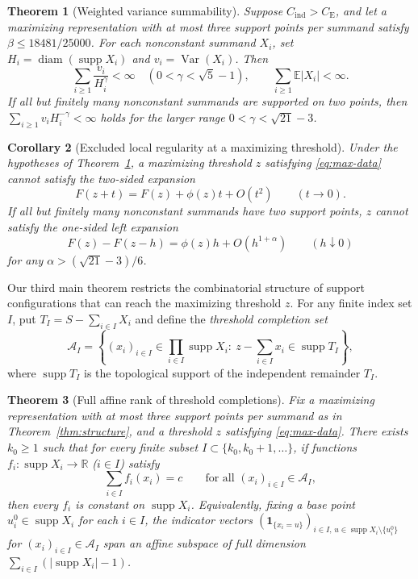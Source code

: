 \documentclass[11pt]{article}
\numberwithin{equation}{section}
\newtheorem{theorem}{Theorem}[section]
\newtheorem{corollary}[theorem]{Corollary}
\theoremstyle{definition}
\DeclareMathOperator{\Var}{Var}
\DeclareMathOperator{\diam}{diam}
\DeclareMathOperator{\supp}{supp}
\newcommand{\E}{\mathbb E}
\newcommand{\R}{\mathbb R}
\newcommand{\ind}{\mathbf1}
\newcommand{\ce}{C_{\mathrm E}}
\newcommand{\ci}{C_{\mathrm{ind}}}
\begin{document}
\begin{theorem}[Weighted variance summability]\label{thm:weighted-variance}
Suppose $\ci>\ce$, and let a maximizing representation with at most three
support points per summand satisfy $\beta\le18481/25000$. For each
nonconstant summand $X_i$, set $H_i=\diam(\supp X_i)$ and $v_i=\Var(X_i)$.
Then
\[
 \sum_{i\ge1}\frac{v_i}{H_i^\gamma}<\infty
       \quad(0<\gamma<\sqrt5-1),\qquad
                         \sum_{i\ge1}\E|X_i|<\infty.
\]
If all but finitely many nonconstant summands are supported on two points,
then $\sum_{i\ge1}v_iH_i^{-\gamma}<\infty$ holds for the larger range
$0<\gamma<\sqrt{21}-3$.
\end{theorem}

\begin{corollary}[Excluded local regularity at a maximizing threshold]
\label{cor:weighted-regularity}
Under the hypotheses of Theorem~\ref{thm:weighted-variance}, a maximizing
threshold $z$ satisfying \eqref{eq:max-data} cannot satisfy the two-sided
expansion
\[
             F(z+t)=F(z)+\phi(z)t+O(t^2)\qquad(t\to0).
\]
If all but finitely many nonconstant summands have two support points, $z$
cannot satisfy the one-sided left expansion
\[
       F(z)-F(z-h)=\phi(z)h+O(h^{1+\alpha})\qquad(h\downarrow0)
\]
for any $\alpha>(\sqrt{21}-3)/6$.
\end{corollary}

Our third main theorem restricts the combinatorial structure of support
configurations that can reach the maximizing threshold $z$. For any finite
index set $I$, put $T_I=S-\sum_{i\in I}X_i$ and define the \emph{threshold
completion set}
\begin{equation}\label{eq:completion}
 \mathcal A_I=
 \left\{(x_i)_{i\in I}\in\prod_{i\in I}\supp X_i:\
       z-\sum_{i\in I}x_i\in\supp T_I\right\},
\end{equation}
where $\supp T_I$ is the topological support of the independent remainder
$T_I$.

\begin{theorem}[Full affine rank of threshold completions]\label{thm:rank}
Fix a maximizing representation with at most three support points per
summand as in Theorem~\ref{thm:structure}, and a threshold $z$ satisfying
\eqref{eq:max-data}. There exists $k_0\ge1$ such that for every finite subset
$I\subset\{k_0,k_0+1,\ldots\}$, if functions $f_i:\supp X_i\to\R$ ($i\in I$)
satisfy
\[
             \sum_{i\in I}f_i(x_i)=c
             \qquad\text{for all }(x_i)_{i\in I}\in\mathcal A_I,
\]
then every $f_i$ is constant on $\supp X_i$. Equivalently, fixing a base point
$u_i^0\in\supp X_i$ for each $i\in I$, the indicator vectors
$(\ind_{\{x_i=u\}})_{i\in I,\,u\in\supp X_i\setminus\{u_i^0\}}$ for
$(x_i)_{i\in I}\in\mathcal A_I$ span an affine subspace of full dimension
$\sum_{i\in I}(|\supp X_i|-1)$.
\end{theorem}
\end{document}
